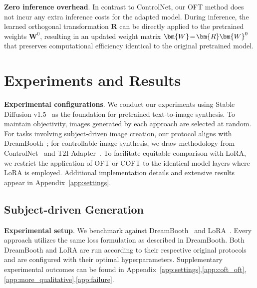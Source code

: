 \textbf{Zero inference overhead}. In contrast to ControlNet, our OFT method does not incur any extra inference costs for the adapted model. During inference, the learned orthogonal transformation $\bm{R}$ can be directly applied to the pretrained weights $\bm{W}^0$, resulting in an updated weight matrix $\thickmuskip=2mu \medmuskip=2mu \bm{W}=\bm{R}\bm{W}^0$ that preserves computational efficiency identical to the original pretrained model.

\section{Experiments and Results}

\textbf{Experimental configurations}. We conduct our experiments using Stable Diffusion v1.5~\cite{rombach2022high} as the foundation for pretrained text-to-image synthesis. To maintain objectivity, images generated by each approach are selected at random. For tasks involving subject-driven image creation, our protocol aligns with DreamBooth~\cite{ruiz2023dreambooth}; for controllable image synthesis, we draw methodology from ControlNet~\cite{zhang2023adding} and T2I-Adapter~\cite{mou2023t2i}. To facilitate equitable comparison with LoRA, we restrict the application of OFT or COFT to the identical model layers where LoRA is employed. Additional implementation details and extensive results appear in Appendix~\ref{app:settings}.

\subsection{Subject-driven Generation}

\textbf{Experimental setup}. We benchmark against DreamBooth~\cite{ruiz2023dreambooth} and LoRA~\cite{hulora2022}. Every approach utilizes the same loss formulation as described in DreamBooth. Both DreamBooth and LoRA are run according to their respective original protocols and are configured with their optimal hyperparameters. Supplementary experimental outcomes can be found in Appendix~\ref{app:settings},\ref{app:coft_oft},\ref{app:more_qualitative},\ref{app:failure}.

